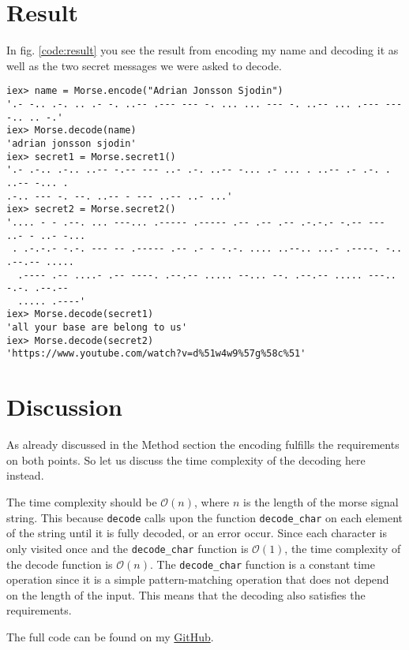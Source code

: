 \documentclass[a4paper,11pt]{article}
\newenvironment{code}{\captionsetup{type=listing}}{}
\begin{document}
\section*{Result}
In fig. \ref{code:result} you see the result from encoding my name and decoding it as well as the two secret messages we were asked to decode.

\begin{code}
\label{code:result}
\begin{verbatim}
iex> name = Morse.encode("Adrian Jonsson Sjodin")
'.- -.. .-. .. .- -. ..-- .--- --- -. ... ... --- -. ..-- ... .--- --- -.. .. -.'
iex> Morse.decode(name)                          
'adrian jonsson sjodin'
iex> secret1 = Morse.secret1()
'.- .-.. .-.. ..-- -.-- --- ..- .-. ..-- -... .- ... . ..-- .- .-. . ..-- -... . 
.-.. --- -. --. ..-- - --- ..-- ..- ...'
iex> secret2 = Morse.secret2()
'.... - - .--. ... ---... .----- .----- .-- .-- .-- .-.-.- -.-- --- ..- - ..- -...
 . .-.-.- -.-. --- -- .----- .-- .- - -.-. .... ..--.. ...- .----. -.. .--.-- .....
  .---- .-- ....- .-- ----. .--.-- ..... --... --. .--.-- ..... ---.. -.-. .--.-- 
  ..... .----'
iex> Morse.decode(secret1)    
'all your base are belong to us'
iex> Morse.decode(secret2)
'https://www.youtube.com/watch?v=d%51w4w9%57g%58c%51'
\end{verbatim}
\end{code}
\section*{Discussion}
As already discussed in the Method section the encoding fulfills the requirements on both points. So let us discuss the time complexity 
of the decoding here instead.

The time complexity should be $\mathcal{O}(n)$, where $n$ is the length of the morse signal string. This because {\tt decode} calls upon 
the function {\tt decode\_char} on each element of the string until it is fully decoded, or an error occur. Since each character is only
visited once and the {\tt decode\_char} function is $\mathcal{O}(1)$, the time complexity of the decode function is $\mathcal{O}(n)$.
The {\tt decode\_char} function is a constant time operation since it is a simple pattern-matching operation that does
not depend on the length of the input. This means that the decoding also satisfies the requirements. 

The full code can be found on my \href{https://github.com/adrian-jonsson-sjoedin/ID1019-Programming-II/tree/main/Task1_Solution}{GitHub}.
\end{document}
